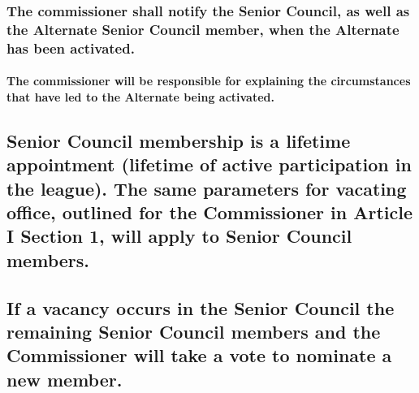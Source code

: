 \documentclass[]{book}
\let\oldparagraph\paragraph
\renewcommand{\paragraph}[1]{\oldparagraph{#1}\mbox{}}
\begin{document}
\hypertarget{the-commissioner-shall-notify-the-senior-council-as-well-as-the-alternate-senior-council-member-when-the-alternate-has-been-activated.}{%
\subsubsection{The commissioner shall notify the Senior Council, as well as the Alternate Senior Council member, when the Alternate has been activated.}\label{the-commissioner-shall-notify-the-senior-council-as-well-as-the-alternate-senior-council-member-when-the-alternate-has-been-activated.}}

\hypertarget{the-commissioner-will-be-responsible-for-explaining-the-circumstances-that-have-led-to-the-alternate-being-activated.}{%
\paragraph{The commissioner will be responsible for explaining the circumstances that have led to the Alternate being activated.}\label{the-commissioner-will-be-responsible-for-explaining-the-circumstances-that-have-led-to-the-alternate-being-activated.}}

\hypertarget{senior-council-membership-is-a-lifetime-appointment-lifetime-of-active-participation-in-the-league.-the-same-parameters-for-vacating-office-outlined-for-the-commissioner-in-article-i-section-1-will-apply-to-senior-council-members.}{%
\subsection{Senior Council membership is a lifetime appointment (lifetime of active participation in the league). The same parameters for vacating office, outlined for the Commissioner in Article I Section 1, will apply to Senior Council members.}\label{senior-council-membership-is-a-lifetime-appointment-lifetime-of-active-participation-in-the-league.-the-same-parameters-for-vacating-office-outlined-for-the-commissioner-in-article-i-section-1-will-apply-to-senior-council-members.}}

\hypertarget{if-a-vacancy-occurs-in-the-senior-council-the-remaining-senior-council-members-and-the-commissioner-will-take-a-vote-to-nominate-a-new-member.}{%
\subsection{If a vacancy occurs in the Senior Council the remaining Senior Council members and the Commissioner will take a vote to nominate a new member.}\label{if-a-vacancy-occurs-in-the-senior-council-the-remaining-senior-council-members-and-the-commissioner-will-take-a-vote-to-nominate-a-new-member.}}
\end{document}
